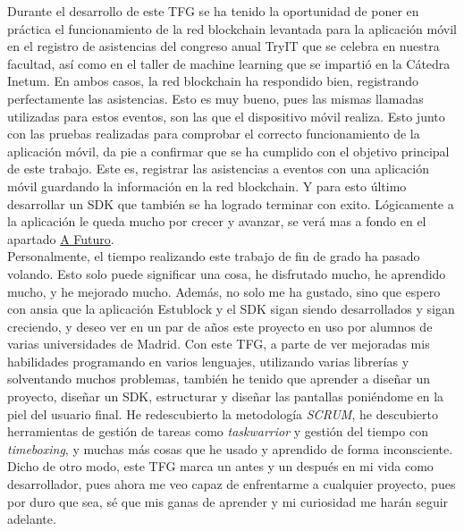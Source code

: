 Durante el desarrollo de este TFG se ha tenido la oportunidad de poner en práctica el funcionamiento de la red blockchain levantada para la aplicación móvil en el registro de asistencias del congreso anual TryIT que se celebra en nuestra facultad, así como en el taller de machine learning que se impartió en la Cátedra Inetum. En ambos casos, la red blockchain ha respondido bien, registrando perfectamente las asistencias. Esto es muy bueno, pues las mismas llamadas utilizadas para estos eventos, son las que el dispositivo móvil realiza. Esto junto con las pruebas realizadas para comprobar el correcto funcionamiento de la aplicación móvil, da pie a confirmar que se ha cumplido con el objetivo principal de este trabajo. Este es, registrar las asistencias a eventos con una aplicación móvil guardando la información en la red blockchain. Y para esto último desarrollar un SDK que también se ha logrado terminar con exito. Lógicamente a la aplicación le queda mucho por crecer y avanzar, se verá mas a fondo en el apartado \hyperref[cap:Futuro]{A Futuro}. \\

Personalmente, el tiempo realizando este trabajo de fin de grado ha pasado volando. Esto solo puede significar una cosa, he disfrutado mucho, he aprendido mucho, y he mejorado mucho. Además, no solo me ha gustado, sino que espero con ansia que la aplicación Estublock y el SDK sigan siendo desarrollados y sigan creciendo, y deseo ver en un par de años este proyecto en uso por alumnos de varias universidades de Madrid. Con este TFG, a parte de ver mejoradas mis habilidades programando en varios lenguajes, utilizando varias librerías y solventando muchos problemas, también he tenido que aprender a diseñar un proyecto, diseñar un SDK, estructurar y diseñar las pantallas poniéndome en la piel del usuario final. He redescubierto la metodología \emph{SCRUM}, he descubierto herramientas de gestión de tareas como \emph{taskwarrior} y gestión del tiempo con \emph{timeboxing}, y muchas más cosas que he usado y aprendido de forma inconsciente. Dicho de otro modo, este TFG marca un antes y un después en mi vida como desarrollador, pues ahora me veo capaz de enfrentarme a cualquier proyecto, pues por duro que sea, sé que mis ganas de aprender y mi curiosidad me harán seguir adelante.

